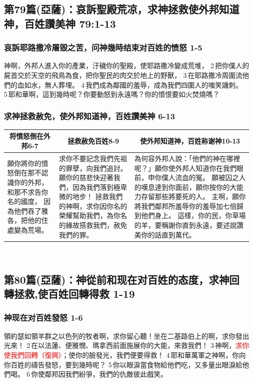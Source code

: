 \subsection{第79篇(亞薩)：哀訴聖殿荒凉，求神拯救使外邦知道神，百姓讚美神  79:1-13}


\subsubsection{哀訴耶路撒冷屠毀之苦，问神幾時结束对百姓的愤怒 1-5}
神啊，外邦人進入你的產業，汙穢你的聖殿，使耶路撒冷變成荒堆，
2 把你僕人的屍首交於天空的飛鳥為食，把你聖民的肉交於地上的野獸，
3 在耶路撒冷周圍流他們的血如水，無人葬埋。
4 我們成為鄰國的羞辱，成為我們四圍人的嗤笑譏刺。
5 耶和華啊，這到幾時呢？你要動怒到永遠嗎？你的憤恨要如火焚燒嗎？

\subsubsection{求神拯救赦免，使外邦知道神，百姓讚美神 6-13}
\begin{table}[H]
\centering
\begin{tabular}{p{3.25cm}|p{5cm}|p{8.25cm}}\hline\hline
\multicolumn{1}{c|}{将憤怒倒在外邦6-7}&\multicolumn{1}{c|}{拯救赦免百姓8-9}&\multicolumn{1}{c}{使外邦知道神，百姓称谢神10-13}\\\hline
願你將你的憤怒倒在那不認識你的外邦，和那不求告你名的國度，
因為他們吞了雅各，把他的住處變為荒場。
&求你不要記念我們先祖的罪孽，向我們追討。願你的慈悲快迎著我們，因為我們落到極卑微的地步！
拯救我們的神啊，求你因你名的榮耀幫助我們，為你名的緣故搭救我們，赦免我們的罪。
&為何容外邦人說：「他們的神在哪裡呢？」願你使外邦人知道你在我們眼前，申你僕人流血的冤。
願被囚之人的嘆息達到你面前，願你按你的大能力存留那些將要死的人。
主啊，願你將我們鄰邦所羞辱你的羞辱加七倍歸到他們身上。
這樣，你的民，你草場的羊，要稱謝你直到永遠，要述說讚美你的話直到萬代。\\\hline
\end{tabular}
\end{table} 


\subsection{第80篇(亞薩)：神從前和现在对百姓的态度，求神回轉拯救,使百姓回轉得救 1-19}
\subsubsection{神现在对百姓發怒 1-6}
領約瑟如領羊群之以色列的牧者啊，求你留心聽！坐在二基路伯上的啊，求你發出光來！
2 在以法蓮、便雅憫、瑪拿西前面施展你的大能，來救我們！
3 神啊，\textcolor{red}{求你使我們回轉（復興）}；使你的臉發光，我們便要得救！
4 耶和華萬軍之神啊，你向你百姓的禱告發怒，要到幾時呢？
5 你以眼淚當食物給他們吃，又多量出眼淚給他們喝。
6 你使鄰邦因我們紛爭，我們的仇敵彼此戲笑。

